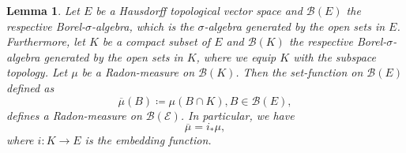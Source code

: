 \documentclass[11pt,a4paper,twoside,openany]{report}
\numberwithin{equation}{section}
\theoremstyle{plain} %
\newtheorem{lemma}[theorem]{Lemma}
\theoremstyle{definition} %
\theoremstyle{remark} %
\begin{document}
\begin{lemma}\label{lemma:radon measures on compact subspaces}
 Let \(E\) be a Hausdorff topological vector space and \(\mathcal{B}(E)\) the respective Borel-\(\sigma\)-algebra, which is the \(\sigma\)-algebra generated by the open sets in \(E\). Furthermore, let \(K\) be a compact subset of \(E\) and \(\mathcal{B}(K)\) the respective Borel-\(\sigma\)-algebra generated by the open sets in \(K\), where we equip \(K\) with the subspace topology. Let \(\mu\) be a Radon-measure on \(\mathcal{B}(K)\). Then the set-function on \(\mathcal{B}(E)\)
 defined as
 \begin{equation*}
     \overline{\mu}(B)\coloneqq \mu(B\cap K),B\in\mathcal{B}(E),
 \end{equation*}
 defines a Radon-measure on \(\mathcal{B(E)}\). In particular, we have 
 \begin{equation}\label{eq:inclusion mapping}
     \overline{\mu}=i_*\mu,
 \end{equation}
 where \(i:K\to E\) is the embedding function.
\end{lemma}
\end{document}
